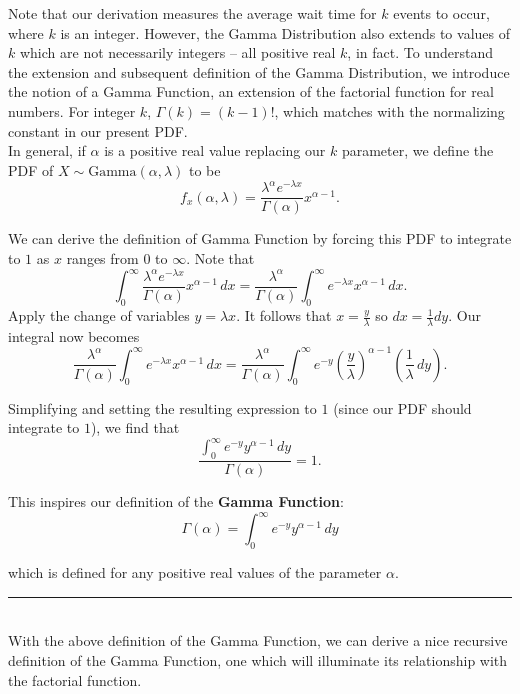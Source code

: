 \begin{enumerate}[a)]
    Note that our derivation measures the average wait time for $k$ events to occur, where $k$ is an integer. 
    However, the Gamma Distribution also extends to values of $k$ which are not necessarily integers -- all positive real $k$, in fact. To understand the extension
    and subsequent definition of the Gamma Distribution, we introduce the notion of a Gamma Function, an extension of the factorial function for real numbers. 
    For integer $k$, $\Gamma(k) = (k-1)!$, which matches with the normalizing constant in our present PDF. \\

    In general, if $\alpha$ is a positive real value replacing our $k$ parameter, we define the PDF of $X \sim \mathrm{Gamma}(\alpha, \lambda)$ to be
    \[
        f_x(\alpha, \lambda) = \frac{\lambda^\alpha e^{-\lambda x}}{\Gamma(\alpha)} x^{\alpha-1}.
    \] 

    We can derive the definition of Gamma Function by forcing this PDF to integrate to $1$ as $x$ ranges from $0$ to $\infty$. Note that
    \[
        \int_0^{\infty} \frac{\lambda^\alpha e^{-\lambda x}}{\Gamma(\alpha)} x^{\alpha-1} \, dx = \frac{\lambda^\alpha}{\Gamma(\alpha)}\int_0^{\infty} e^{-\lambda x} x^{\alpha-1} \, dx.
    \]
    Apply the change of variables $y = \lambda x$. It follows that $x = \frac{y}{\lambda}$ so $dx = \frac{1}{\lambda} dy$. Our integral now becomes
    \[
        \frac{\lambda^\alpha}{\Gamma(\alpha)}\int_0^{\infty} e^{-\lambda x} x^{\alpha-1} \, dx = \frac{\lambda^\alpha}{\Gamma(\alpha)}\int_0^{\infty} e^{-y} \left( \frac{y}{\lambda} \right) ^{\alpha-1} \left(\frac{1}{\lambda }\, dy\right).
    \]

    Simplifying and setting the resulting expression to $1$ (since our PDF should integrate to $1$), we find that
    \[
        \frac{\int_0^{\infty} e^{-y} y^{\alpha - 1} \, dy}{\Gamma(\alpha)} = 1.
    \]

    This inspires our definition of the \textbf{Gamma Function}: 
    \[
        \boxed{\Gamma(\alpha) = \int_0^{\infty} e^{-y} y^{\alpha - 1} \, dy}
    \]

    which is defined for any positive real values of the parameter $\alpha$.

    \noindent\rule{\textwidth}{1pt} \\

    With the above definition of the Gamma Function, we can derive a nice recursive definition of the Gamma Function, 
    one which will illuminate its relationship with the factorial function. \\


\end{enumerate}
